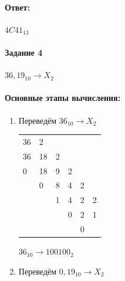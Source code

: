 \documentclass[12pt,onecolumn]{article}
\begin{document}
\paragraph{Ответ:}
$4C41_{13}$

\paragraph{Задание 4}
$36,19_{10} \rightarrow X_{2}$
\paragraph{Основные этапы вычисления:}
\begin{enumerate}
\item Переведём $36_{10} \rightarrow X_{2}$

\FloatBarrier
\begin{table}[bh]
\centering
\begin{tabular}{llllll}
\multicolumn{1}{l|}{36} & 2                       &                        &                        &                        &    \\ 
\cline{2-2}
\multicolumn{1}{l|}{36} & \multicolumn{1}{l|}{18} & 2                      &                        &                        &    \\ 
\cline{1-1}\cline{3-3}
0                       & \multicolumn{1}{l|}{18} & \multicolumn{1}{l|}{9} & 2                      &                        &    \\ 
\cline{2-2}\cline{4-4}
                        & 0                       & \multicolumn{1}{l|}{8} & \multicolumn{1}{l|}{4} & 2                      &    \\ 
\cline{3-3}\cline{5-5}
                        &                         & 1                      & \multicolumn{1}{l|}{4} & \multicolumn{1}{l|}{2} & 2  \\ 
\cline{4-4}\cline{6-6}
                        &                         &                        & 0                      & \multicolumn{1}{l|}{2} & 1  \\ 
\cline{5-5}
                        &                         &                        &                        & 0                      &   
\end{tabular}
\end{table}
\FloatBarrier
$36_{10} \rightarrow 100100_{2}$
\item Переведём $0,19_{10} \rightarrow X_{2}$
\FloatBarrier
\begin{table}[bh]
\centering
\begin{tabular}{|l|l|llll}

\end{tabular}
\end{table}
\end{enumerate}
\end{document}
